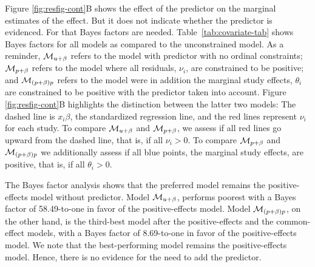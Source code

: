 \documentclass[english,,man]{apa6}
\begin{document}
Figure \ref{fig:resfig-cont}B shows the effect of the predictor on the marginal estimates of the effect. But it does not indicate whether the predictor is evidenced. For that Bayes factors are needed. Table~\ref{tab:covariate-tab} shows Bayes factors for all models as compared to the unconstrained model. As a reminder, \({\cal M}_{u+\beta}\) refers to the model with predictor with no ordinal constraints; \({\cal M}_{p+\beta}\) refers to the model where all residuals, \(\nu_i\), are constrained to be positive; and \({\cal M}_{(p+\beta)p}\) refers to the model were in addition the marginal study effects, \(\theta_i\) are constrained to be positive with the predictor taken into account. Figure \ref{fig:resfig-cont}B highlights the distinction between the latter two models: The dashed line is \(x_i\beta\), the standardized regression line, and the red lines represent \(\nu_i\) for each study. To compare \({\cal M}_{u+\beta}\) and \({\cal M}_{p+\beta}\), we assess if all red lines go upward from the dashed line, that is, if all \(\nu_i > 0\). To compare \({\cal M}_{p+\beta}\) and \({\cal M}_{(p+\beta)p}\) we additionally assess if all blue points, the marginal study effects, are positive, that is, if all \(\theta_i > 0\).

The Bayes factor analysis shows that the preferred model remains the positive-effects model without predictor. Model \({\cal M}_{u+\beta}\), performs poorest with a Bayes factor of 58.49-to-one in favor of the positive-effects model. Model \({\cal M}_{(p+\beta)p}\), on the other hand, is the third-best model after the positive-effects and the common-effect models, with a Bayes factor of 8.69-to-one in favor of the positive-effects model. We note that the best-performing model remains the positive-effects model. Hence, there is no evidence for the need to add the predictor.
\end{document}
